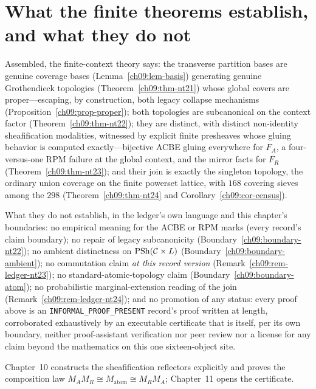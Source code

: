 \section{What the finite theorems establish, and what they do not}\label{ch09:sec-closing}

Assembled, the finite-context theory says: the transverse partition bases are genuine coverage bases (Lemma~\ref{ch09:lem-basis}) generating genuine Grothendieck topologies (Theorem~\ref{ch09:thm-nt21}) whose global covers are proper---escaping, by construction, both legacy collapse mechanisms (Proposition~\ref{ch09:prop-proper}); both topologies are subcanonical on the context factor (Theorem~\ref{ch09:thm-nt22}); they are distinct, with distinct non-identity sheafification modalities, witnessed by explicit finite presheaves whose gluing behavior is computed exactly---bijective ACBE gluing everywhere for $F_{A}$, a four-versus-one RPM failure at the global context, and the mirror facts for $F_{R}$ (Theorem~\ref{ch09:thm-nt23}); and their join is exactly the singleton topology, the ordinary union coverage on the finite powerset lattice, with $168$ covering sieves among the $298$ (Theorem~\ref{ch09:thm-nt24} and Corollary~\ref{ch09:cor-census}).

What they do not establish, in the ledger's own language and this chapter's boundaries: no empirical meaning for the ACBE or RPM marks (every record's claim boundary); no repair of legacy subcanonicity (Boundary~\ref{ch09:boundary-nt22}); no ambient distinctness on $\mathrm{PSh}(\mathcal{C}\times L)$ (Boundary~\ref{ch09:boundary-ambient}); no commutation claim \emph{at this record version} (Remark~\ref{ch09:rem-ledger-nt23}); no standard-atomic-topology claim (Boundary~\ref{ch09:boundary-atom}); no probabilistic marginal-extension reading of the join (Remark~\ref{ch09:rem-ledger-nt24}); and no promotion of any status: every proof above is an \texttt{INFORMAL\_PROOF\_PRESENT} record's proof written at length, corroborated exhaustively by an executable certificate that is itself, per its own boundary, neither proof-assistant verification nor peer review nor a license for any claim beyond the mathematics on this one sixteen-object site.

Chapter~10 constructs the sheafification reflectors explicitly and proves the composition law $M_{A}M_{R}\cong M_{\mathrm{atom}}\cong M_{R}M_{A}$; Chapter~11 opens the certificate.
